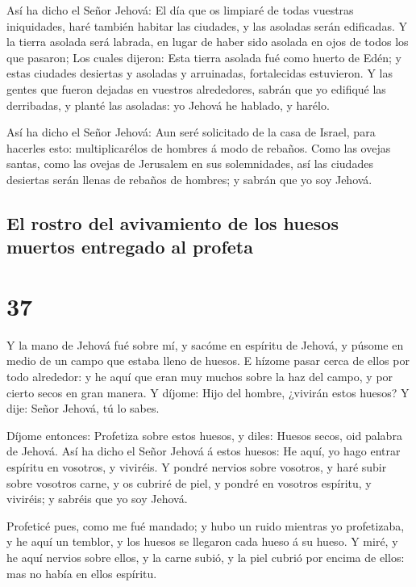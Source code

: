  Así ha dicho el Señor Jehová: El día que os limpiaré de
todas vuestras iniquidades, haré también habitar las ciudades, y las
asoladas serán edificadas.  Y la tierra asolada será
labrada, en lugar de haber sido asolada en ojos de todos los que
pasaron;  Los cuales dijeron: Esta tierra asolada fué como
huerto de Edén; y estas ciudades desiertas y asoladas y arruinadas,
fortalecidas estuvieron.  Y las gentes que fueron dejadas
en vuestros alrededores, sabrán que yo edifiqué las derribadas, y planté
las asoladas: yo Jehová he hablado, y harélo.

 Así ha dicho el Señor Jehová: Aun seré solicitado de la
casa de Israel, para hacerles esto: multiplicarélos de hombres á modo de
rebaños.  Como las ovejas santas, como las ovejas de
Jerusalem en sus solemnidades, así las ciudades desiertas serán llenas
de rebaños de hombres; y sabrán que yo soy Jehová.

\hypertarget{el-rostro-del-avivamiento-de-los-huesos-muertos-entregado-al-profeta}{%
\subsection{El rostro del avivamiento de los huesos muertos entregado al
profeta}\label{el-rostro-del-avivamiento-de-los-huesos-muertos-entregado-al-profeta}}

\hypertarget{section-36}{%
\section{37}\label{section-36}}

 Y la mano de Jehová fué sobre mí, y sacóme en espíritu de
Jehová, y púsome en medio de un campo que estaba lleno de huesos.
 E hízome pasar cerca de ellos por todo alrededor: y he aquí
que eran muy muchos sobre la haz del campo, y por cierto secos en gran
manera.  Y díjome: Hijo del hombre, ¿vivirán estos huesos? Y
dije: Señor Jehová, tú lo sabes.

 Díjome entonces: Profetiza sobre estos huesos, y diles:
Huesos secos, oid palabra de Jehová.  Así ha dicho el Señor
Jehová á estos huesos: He aquí, yo hago entrar espíritu en vosotros, y
viviréis.  Y pondré nervios sobre vosotros, y haré subir
sobre vosotros carne, y os cubriré de piel, y pondré en vosotros
espíritu, y viviréis; y sabréis que yo soy Jehová.

 Profeticé pues, como me fué mandado; y hubo un ruido
mientras yo profetizaba, y he aquí un temblor, y los huesos se llegaron
cada hueso á su hueso.  Y miré, y he aquí nervios sobre
ellos, y la carne subió, y la piel cubrió por encima de ellos: mas no
había en ellos espíritu.

